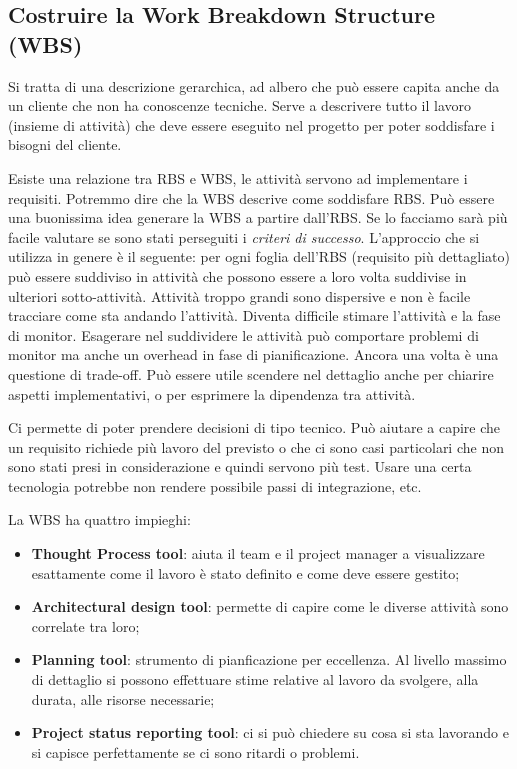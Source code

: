 \subsection{Costruire la Work Breakdown Structure (WBS)}
Si tratta di una descrizione gerarchica, ad albero che può essere capita anche da un cliente che non ha conoscenze tecniche.
Serve a descrivere tutto il lavoro (insieme di attività) che deve essere eseguito nel progetto per poter soddisfare i bisogni del cliente.

\noindent Esiste una relazione tra RBS e WBS, le attività servono ad implementare i requisiti. Potremmo dire che la WBS descrive come soddisfare RBS. Può essere una buonissima idea generare la WBS a partire dall'RBS. Se lo facciamo sarà più facile valutare se sono stati perseguiti i \textit{criteri di successo}.\newline
\noindent L'approccio che si utilizza in genere è il seguente: per ogni foglia dell'RBS (requisito più dettagliato) può essere suddiviso in attività che possono essere a loro volta suddivise in ulteriori sotto-attività. Attività troppo grandi sono dispersive e non è facile tracciare come sta andando l'attività. Diventa difficile stimare l'attività e la fase di monitor.\newline
Esagerare nel suddividere le attività può comportare problemi di monitor ma anche un overhead in fase di pianificazione. Ancora una volta è una questione di trade-off. Può essere utile scendere nel dettaglio anche per chiarire aspetti implementativi, o per esprimere la dipendenza tra attività.

\begin{info}
	Ci permette di poter prendere decisioni di tipo tecnico. Può aiutare a capire che un requisito richiede più lavoro del previsto o che ci sono casi particolari che non sono stati presi in considerazione e quindi servono più test. Usare una certa tecnologia potrebbe non rendere possibile passi di integrazione, etc.
\end{info}

\noindent La WBS ha quattro impieghi:
\begin{itemize}
	\item \textbf{Thought Process tool}: aiuta il team e il project manager a visualizzare esattamente come il lavoro è stato definito e come deve essere gestito;
	\item \textbf{Architectural design tool}: permette di capire come le diverse attività sono correlate tra loro;
	\item \textbf{Planning tool}: strumento di pianficazione per eccellenza. Al livello massimo di dettaglio si possono effettuare stime relative al lavoro da svolgere, alla durata, alle risorse necessarie;
	\item \textbf{Project status reporting tool}: ci si può chiedere su cosa si sta lavorando e si capisce perfettamente se ci sono ritardi o problemi.
\end{itemize}

